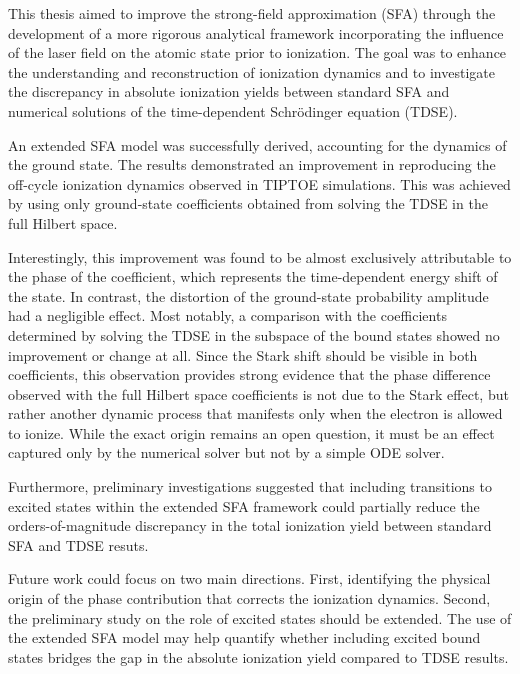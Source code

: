 This thesis aimed to improve the strong-field approximation (SFA) through the development of a more rigorous analytical framework incorporating the influence of the laser field on the atomic state prior to ionization. The goal was to enhance the understanding and reconstruction of ionization dynamics and to investigate the discrepancy in absolute ionization yields between standard SFA and numerical solutions of the time-dependent Schrödinger equation (TDSE).

\medskip
An extended SFA model was successfully derived, accounting for the dynamics of the ground state. The results demonstrated an improvement in reproducing the off-cycle ionization dynamics observed in TIPTOE simulations. This was achieved by using only ground-state coefficients obtained from solving the TDSE in the full Hilbert space.

\medskip
Interestingly, this improvement was found to be almost exclusively attributable to the phase of the coefficient, which represents the time-dependent energy shift of the state. In contrast, the distortion of the ground-state probability amplitude had a negligible effect. Most notably, a comparison with the coefficients determined by solving the TDSE in the subspace of the bound states showed no improvement or change at all.
Since the Stark shift should be visible in both coefficients, this observation provides strong evidence that the phase difference observed with the full Hilbert space coefficients is not due to the Stark effect, but rather another dynamic process that manifests only when the electron is allowed to ionize. While the exact origin remains an open question, it must be an effect captured only by the numerical solver but not by a simple ODE solver.

\medskip
Furthermore, preliminary investigations suggested that including transitions to excited states within the extended SFA framework could partially reduce the orders-of-magnitude discrepancy in the total ionization yield between standard SFA and TDSE resuts.

\medskip
Future work could focus on two main directions. First, identifying the physical origin of the phase contribution that corrects the ionization dynamics. Second, the preliminary study on the role of excited states should be extended. The use of the extended SFA model may help quantify whether including excited bound states bridges the gap in the absolute ionization yield compared to TDSE results.